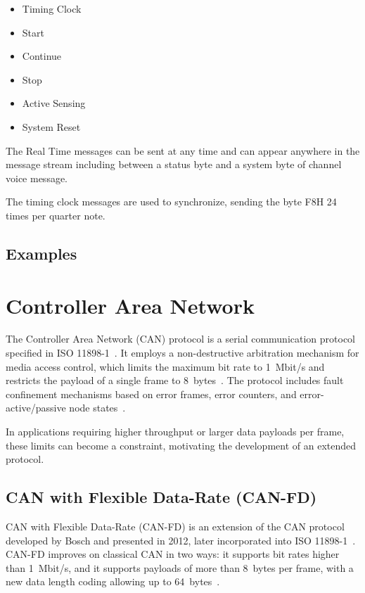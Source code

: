 \begin{itemize}
	\item Timing Clock
	\item Start
	\item Continue
	\item Stop
	\item Active Sensing
	\item System Reset
\end{itemize}
The Real Time messages can be sent at any time and can appear anywhere in the message stream including between a status byte and a system byte of channel voice message.

The timing clock messages are used to synchronize, sending the byte F8H 24 times per quarter note.


\subsection{Examples}
\cite{MMA1996}
\cite{deoliveira2017understandingmidipainlesstutorial}


\section{Controller Area Network}

The Controller Area Network (CAN) protocol is a serial communication
protocol specified in ISO 11898-1~\cite{iso11898-1}. It employs a
non-destructive arbitration mechanism for media access control, which
limits the maximum bit rate to 1~Mbit/s and restricts the payload of a
single frame to 8~bytes~\cite{hartwich2012can}. The protocol includes
fault confinement mechanisms based on error frames, error counters, and
error-active/passive node states~\cite{hartwich2012can}.

In applications requiring higher throughput or larger data payloads per
frame, these limits can become a constraint, motivating the development
of an extended protocol.

\subsection{CAN with Flexible Data-Rate (CAN-FD)}

CAN with Flexible Data-Rate (CAN-FD) is an extension of the CAN protocol
developed by Bosch and presented in 2012, later incorporated into
ISO 11898-1~\cite{hartwich2012can,iso11898-1}. CAN-FD improves on
classical CAN in two ways: it supports bit rates higher than 1~Mbit/s,
and it supports payloads of more than 8~bytes per frame, with a new data
length coding allowing up to 64~bytes~\cite{hartwich2012can}.

